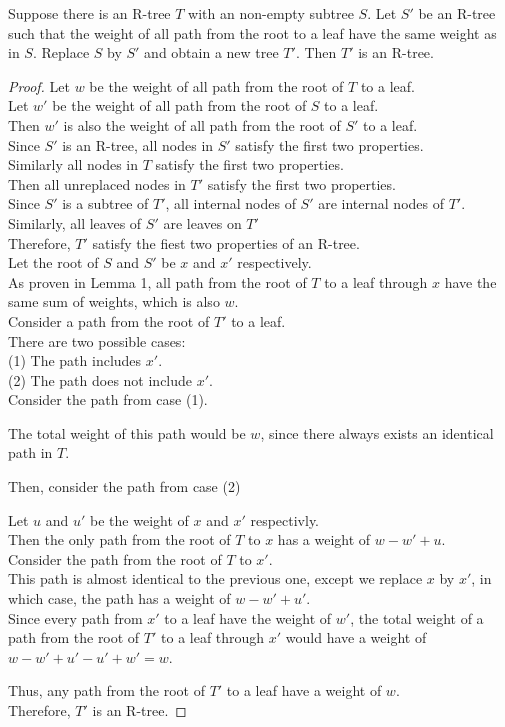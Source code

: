 \documentclass[10pt]{article}
\begin{document}
\begin{enumerate}
	 Suppose there is an R-tree $T$ with an non-empty subtree
		$S$. Let $S'$ be an R-tree such that the weight of all path from the
		root to a leaf have the same weight as in $S$. Replace $S$ by $S'$ and
		obtain a new tree $T'$. Then $T'$ is an R-tree. 
	\begin{proof}
		Let $w$ be the weight of all path from the root of $T$ to a leaf. \\
		Let $w'$ be the weight of all path from the root of $S$ to a leaf. \\
		Then $w'$ is also the weight of all path from the root of $S'$ to a
		leaf. \\
		Since $S'$ is an R-tree, all nodes in $S'$ satisfy the first two
		properties. \\
		Similarly all nodes in $T$ satisfy the first two properties. \\
		Then all unreplaced nodes in $T'$ satisfy the first two properties. \\
		Since $S'$ is a subtree of $T'$, all internal nodes of $S'$ are
		internal nodes of $T'$. \\
		Similarly, all leaves of $S'$ are leaves on $T'$ \\
		Therefore, $T'$ satisfy the fiest two properties of an R-tree. \\
		Let the root of $S$ and $S'$ be $x$ and $x'$ respectively. \\
		As proven in Lemma 1, all path from the root of $T$ to a leaf through
		$x$ have the same sum of weights, which is also $w$. \\
		Consider a path from the root of $T'$ to a leaf. \\
		There are two possible cases:  \\
		(1) The path includes $x'$. \\
		(2) The path does not include $x'$. \\
		Consider the path from case (1). 
		\begin{addmargin}[1em]{0em}
			The total weight of this path would be $w$, since there always
			exists an identical path in $T$. 
		\end{addmargin}
		Then, consider the path from case (2)
		\begin{addmargin}[1em]{0em}
			Let $u$ and $u'$ be the weight of $x$ and $x'$ respectivly. \\
			Then the only path from the root of $T$ to $x$ has a weight of
			$w-w'+u$. \\
			Consider the path from the root of $T$ to $x'$. \\
			This path is almost identical to the previous one, except we
			replace $x$ by $x'$, in which case, the path has a weight of
			$w-w'+u'$. \\
			Since every path from $x'$ to a leaf have the weight of $w'$, the
			total weight of a path from the root of $T'$ to a leaf through $x'$
			would have a weight of $w-w'+u' - u' + w' = w$. \\
		\end{addmargin}
		Thus, any path from the root of $T'$ to a leaf have a weight of $w$. \\
		Therefore, $T'$ is an R-tree.
	\end{proof}


\end{enumerate}
\end{document}
